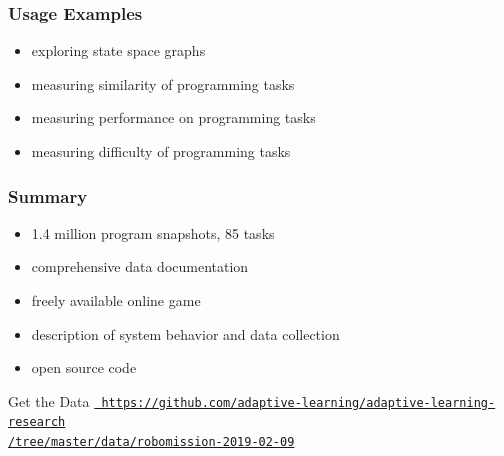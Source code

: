 \documentclass[bigger]{beamer}
\begin{document}
\begin{frame}
  \frametitle{Usage Examples}

  \begin{itemize}
  \item exploring state space graphs  %
  \item measuring similarity of programming tasks
  \item measuring performance on programming tasks
  \item measuring difficulty of programming tasks
  \end{itemize}
\end{frame}


\begin{frame}
  \frametitle{Summary}

  \begin{itemize}
  \item 1.4 million program snapshots, 85 tasks  %
  \item comprehensive data documentation
  \item freely available online game
  \item description of system behavior and data collection
  \item open source code
  \end{itemize}


  \bigskip
  \begin{block}{Get the Data}
  \scriptsize{%
    \href{https://github.com/adaptive-learning/adaptive-learning-research/tree/master/data/robomission-2019-02-09}{\texttt{%
    https://github.com/adaptive-learning/adaptive-learning-research\\
    /tree/master/data/robomission-2019-02-09}}}
  \end{block}

\end{frame}
\end{document}
